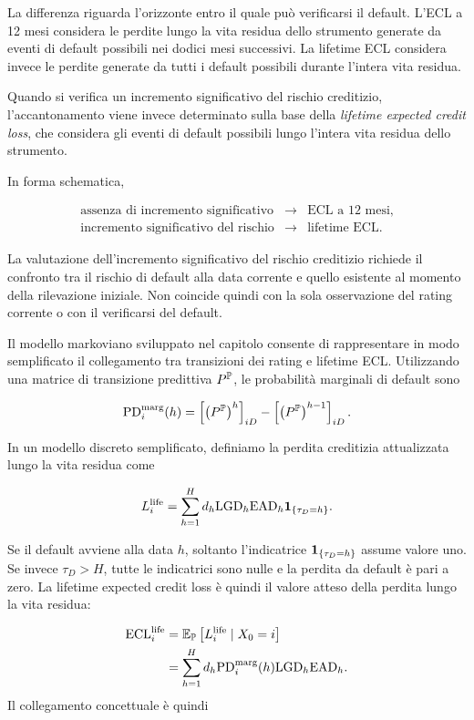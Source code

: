 La differenza riguarda l'orizzonte entro il quale pu\`{o} verificarsi
il default. L'ECL a 12 mesi considera le perdite lungo la vita residua
dello strumento generate da eventi di default possibili nei dodici
mesi successivi. La lifetime ECL considera invece le perdite generate
da tutti i default possibili durante l'intera vita residua.

Quando si verifica un incremento significativo del rischio creditizio,
l'accantonamento viene invece determinato sulla base della
\emph{lifetime expected credit loss}, che considera gli eventi di
default possibili lungo l'intera vita residua dello strumento.

In forma schematica,

\[
\begin{array}{ccl}
\text{assenza di incremento significativo}
&
\longrightarrow
&
\text{ECL a 12 mesi},
\\[2mm]
\text{incremento significativo del rischio}
&
\longrightarrow
&
\text{lifetime ECL}.
\end{array}
\]

La valutazione dell'incremento significativo del rischio creditizio
richiede il confronto tra il rischio di default alla data corrente e
quello esistente al momento della rilevazione iniziale. Non coincide
quindi con la sola osservazione del rating corrente o con il
verificarsi del default.

Il modello markoviano sviluppato nel capitolo consente di rappresentare
in modo semplificato il collegamento tra transizioni dei rating e
lifetime ECL. Utilizzando una matrice di transizione predittiva
$P^{\mathbb{P}}$, le probabilit\`{a} marginali di default sono

\[
\mathrm{PD}_{i}^{\mathrm{marg}}(h)
=
\left[
\left(P^{\mathbb{P}}\right)^h
\right]_{iD}
-
\left[
\left(P^{\mathbb{P}}\right)^{h-1}
\right]_{iD}.
\]

In un modello discreto semplificato, definiamo la perdita creditizia
attualizzata lungo la vita residua come

\[
L_i^{\mathrm{life}}
=
\sum_{h=1}^{H}
d_h
\mathrm{LGD}_h
\mathrm{EAD}_h
\mathbf{1}_{\{\tau_D=h\}}.
\]

Se il default avviene alla data $h$, soltanto l'indicatrice
$\mathbf{1}_{\{\tau_D=h\}}$ assume valore uno. Se invece $\tau_D>H$, tutte le
indicatrici sono nulle e la perdita da default \`{e} pari a zero.
La lifetime expected credit loss \`{e} quindi il valore atteso della
perdita lungo la vita residua:

\[
\begin{split}
\mathrm{ECL}_{i}^{\mathrm{life}}
&=
\mathbb{E}_{\mathbb{P}}
\left[
L_i^{\mathrm{life}}
\mid X_0=i
\right]
\\
&=
\sum_{h=1}^{H}
d_h
\mathrm{PD}_{i}^{\mathrm{marg}}(h)
\mathrm{LGD}_h
\mathrm{EAD}_h.
\end{split}
\]
Il collegamento concettuale \`{e} quindi

